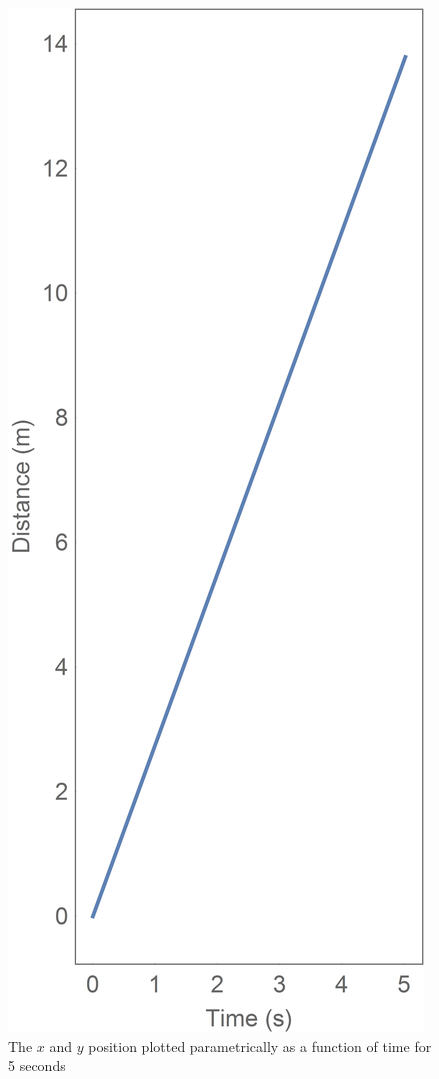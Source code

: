\begin{figure}[!htb]
	\centering
	\includegraphics[width=\linewidth]{RollingWheelXY.jpg}
	\endminipage\hspace{1em}%
	\caption{The $x$ and $y$ position plotted parametrically as a function of time for 5 seconds}\label{fig:RollingWheelXY}
\end{figure}

